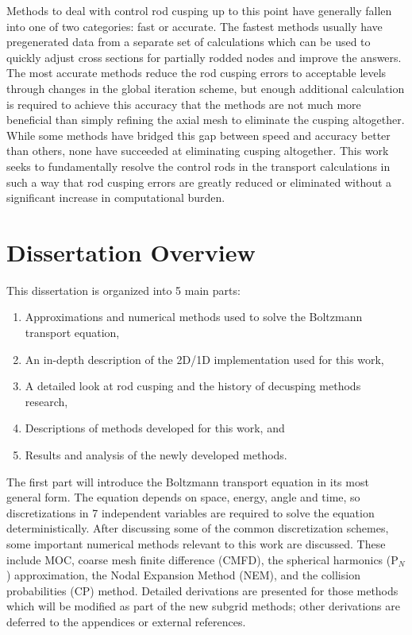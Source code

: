 Methods to deal with control rod cusping up to this point have generally fallen into one of two categories: fast or accurate.  The fastest methods usually have pregenerated data from a separate set of calculations which can be used to quickly adjust cross sections for partially rodded nodes and improve the answers.  The most accurate methods reduce the rod cusping errors to acceptable levels through changes in the global iteration scheme, but enough additional calculation is required to achieve this accuracy that the methods are not much more beneficial than simply refining the axial mesh to eliminate the cusping altogether.  While some methods have bridged this gap between speed and accuracy better than others, none have succeeded at eliminating cusping altogether.  This work seeks to fundamentally resolve the control rods in the transport calculations in such a way that rod cusping errors are greatly reduced or eliminated without a significant increase in computational burden.

\section{Dissertation Overview}

This dissertation is organized into 5 main parts:

\begin{enumerate}
    \item Approximations and numerical methods used to solve the Boltzmann transport equation,
    \item An in-depth description of the 2D/1D implementation used for this work,
    \item A detailed look at rod cusping and the history of decusping methods research,
    \item Descriptions of methods developed for this work, and
    \item Results and analysis of the newly developed methods.
\end{enumerate}

The first part will introduce the Boltzmann transport equation in its most general form.  The equation depends on space, energy, angle and time, so discretizations in 7 independent variables are required to solve the equation deterministically.  After discussing some of the common discretization schemes, some important numerical methods relevant to this work are discussed.  These include MOC, coarse mesh finite difference (CMFD), the spherical harmonics (P$_N$) approximation, the Nodal Expansion Method (NEM), and the collision probabilities (CP) method.  Detailed derivations are presented for those methods which will be modified as part of the new subgrid methods; other derivations are deferred to the appendices or external references.

